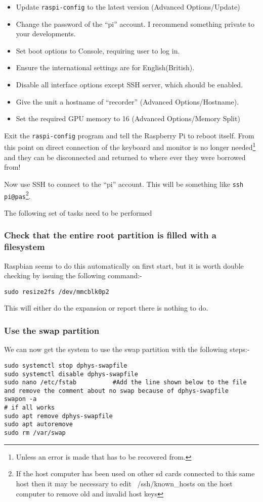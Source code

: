 \documentclass[Draft]{akc}
\begin{document}
\begin{itemize}
\item Update \texttt{raspi-config} to the latest version (Advanced Options/Update)
\item Change the password of the ``pi'' account. I recommend something private to your developments.
\item Set boot options to Console, requiring user to log in.
\item Ensure the international settings are for English(British).
\item Disable all interface options except SSH server, which should be enabled.
\item Give the unit a hostname of ``recorder'' (Advanced Options/Hostname).
\item Set the required GPU memory to 16  (Advanced Options/Memory Split)
\end{itemize}

Exit the \texttt{raspi-config} program and tell the Raspberry Pi to reboot itself.  From this point
on direct connection of the keyboard and monitor is no longer needed\footnote{Unless an error is
made that has to be recovered from.} and they can be disconnected and returned to where ever they
were borrowed from!

Now use SSH to connect to the ``pi'' account.  This will be something like \texttt{ssh pi@pas}\footnote{If
the host computer has been used on other sd cards connected to this same host then it may be necessary to
edit ~/ssh/known\_hosts on the host computer to remove old and invalid host keys}.

The following set of tasks need to be performed

\subsubsection{Check that the entire root partition is filled with a filesystem}

Raspbian seems to do this automatically on first start, but it is worth double checking by
issuing the following command:-

\begin{lstlisting}
sudo resize2fs /dev/mmcblk0p2
\end{lstlisting}

This will either do the expansion or report there is nothing to do.
\subsubsection{Use the swap partition}
We can now get the system to use the swap partition with the following steps:-
\begin{lstlisting}
sudo systemctl stop dphys-swapfile
sudo systemctl disable dphys-swapfile
sudo nano /etc/fstab          #Add the line shown below to the file and remove the comment about no swap because of dphys-swapfile
swapon -a
# if all works
sudo apt remove dphys-swapfile
sudo apt autoremove
sudo rm /var/swap
\end{lstlisting}
\end{document}
